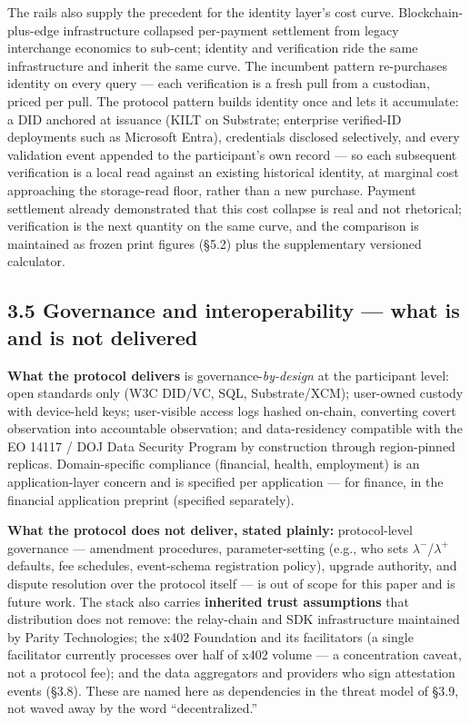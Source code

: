 \documentclass[11pt,twocolumn]{article}
\begin{document}
The rails also supply the precedent for the identity layer's cost curve.
Blockchain-plus-edge infrastructure collapsed per-payment settlement
from legacy interchange economics to sub-cent; identity and verification
ride the same infrastructure and inherit the same curve. The incumbent
pattern re-purchases identity on every query --- each verification is a
fresh pull from a custodian, priced per pull. The protocol pattern
builds identity once and lets it accumulate: a DID anchored at issuance
(KILT on Substrate; enterprise verified-ID deployments such as Microsoft
Entra), credentials disclosed selectively, and every validation event
appended to the participant's own record --- so each subsequent
verification is a local read against an existing historical identity, at
marginal cost approaching the storage-read floor, rather than a new
purchase. Payment settlement already demonstrated that this cost
collapse is real and not rhetorical; verification is the next quantity
on the same curve, and the comparison is maintained as frozen print
figures (§5.2) plus the supplementary versioned calculator.

\subsection*{3.5 Governance and interoperability --- what is and is not
delivered}

\textbf{What the protocol delivers} is
governance-\emph{by-design} at the participant level: open standards
only (W3C DID/VC, SQL, Substrate/XCM); user-owned custody with
device-held keys; user-visible access logs hashed on-chain, converting
covert observation into accountable observation; and data-residency
compatible with the EO 14117 / DOJ Data Security Program
\citep[in force since April 2025]{doj2025} by construction through
region-pinned replicas. Domain-specific compliance (financial, health,
employment) is an application-layer concern and is specified per
application --- for finance, in the financial application preprint (specified separately).

\textbf{What the protocol does not deliver, stated plainly:}
protocol-level governance --- amendment procedures, parameter-setting
(e.g., who sets \(\lambda^{-}\)/\(\lambda^{+}\) defaults, fee schedules,
event-schema registration policy), upgrade authority, and dispute
resolution over the protocol itself --- is out of scope for this paper
and is future work. The stack also carries \textbf{inherited trust
assumptions} that distribution does not remove: the relay-chain and SDK
infrastructure maintained by Parity Technologies; the x402 Foundation
and its facilitators (a single facilitator currently processes over half
of x402 volume --- a concentration caveat, not a protocol fee); and the
data aggregators and providers who sign attestation events (§3.8). These
are named here as dependencies in the threat model of §3.9, not waved
away by the word ``decentralized.''
\end{document}

